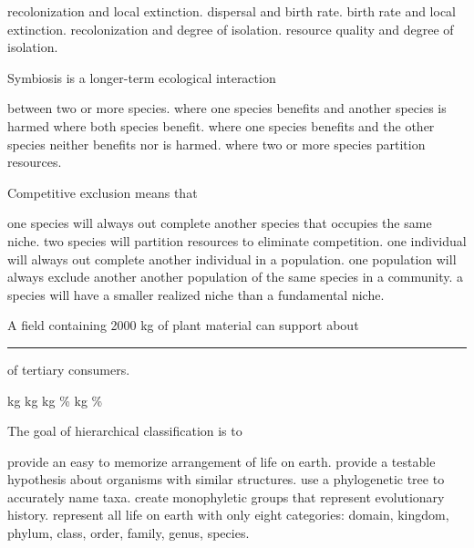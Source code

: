 \begin{choices}
\correctchoice recolonization and local extinction. %
\choice dispersal and birth rate. %
\choice birth rate and local extinction. %
\choice recolonization and degree of isolation. %
\choice resource quality and degree of isolation. %
\end{choices}


\question
Symbiosis is a longer-term ecological interaction

\begin{choices}
\correctchoice between two or more species. %
\choice where one species benefits and another species is harmed %
\choice where both species benefit. %
\choice  where one species benefits and the other species neither benefits nor is harmed. %
\choice where two or more species partition resources. %
\end{choices}


\question
Competitive exclusion means that

\begin{choices}
\correctchoice one species will always out complete another species that occupies the same niche.  %
\choice two species will partition resources to eliminate competition. %
\choice one individual will always out complete another individual in a population. %
\choice one population will always exclude another another population of the same species in a community. %
\choice a species will have a smaller realized niche than a fundamental niche. %
\end{choices}

\question
A field containing 2000 kg of plant material can support about \rule{1in}{0.4pt} of tertiary consumers.

\begin{choices}
 kg %
 kg %
 kg %
\% %
 kg %
\% %
\end{choices}


\question
The goal of hierarchical classification is to

\begin{choices}
\choice provide an easy to memorize arrangement of life on earth.
\choice provide a testable hypothesis about organisms with similar structures.
\choice use a phylogenetic tree to accurately name taxa.
\correctchoice create monophyletic groups that represent evolutionary history.
\choice represent all life on earth with only eight categories: domain, kingdom, phylum, class, order, family, genus, species.
\end{choices}

